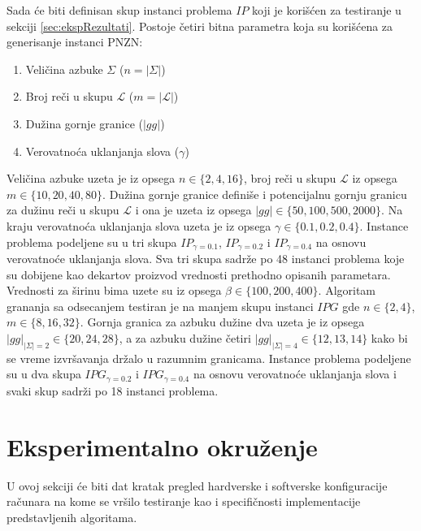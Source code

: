 \documentclass[12pt,oneside]{memoir}
\begin{document}
Sada će biti definisan skup instanci problema $IP$ koji je korišćen za testiranje u sekciji \ref{sec:ekspRezultati}.
Postoje četiri bitna parametra koja su korišćena za generisanje instanci PNZN:
\begin{enumerate}
  \item Veličina azbuke $\Sigma$ ($n=|\Sigma|$)
  \item Broj reči u skupu $\mathcal{L}$ ($m=|\mathcal{L}|$)
  \item Dužina gornje granice ($|gg|$)
  \item Verovatnoća uklanjanja slova ($\gamma$)
\end{enumerate}
Veličina azbuke uzeta je iz opsega $n \in \{2,4,16 \}$, broj reči u skupu $\mathcal{L}$
iz opsega $m \in \{10,20,40,80\}$. Dužina gornje granice definiše i potencijalnu gornju
granicu za dužinu reči u skupu $\mathcal{L}$ i ona je uzeta iz opsega $|gg| \in \{50,100,500,2000\}$.
Na kraju verovatnoća uklanjanja slova uzeta je iz opsega $\gamma \in \{0.1,0.2,0.4\}$.
Instance problema podeljene su u tri skupa $IP_{\gamma=0.1}$, $IP_{\gamma=0.2}$ i $IP_{\gamma=0.4}$
na osnovu verovatnoće uklanjanja slova. Sva tri skupa sadrže po 48 instanci problema
koje su dobijene kao dekartov proizvod vrednosti prethodno opisanih parametara.
Vrednosti za širinu bima uzete su iz opsega $\beta \in \{100,200,400\}$.
Algoritam grananja sa odsecanjem testiran je na manjem skupu instanci
$IPG$ gde $n \in \{2,4\}$, $m \in \{8,16,32\}$. Gornja granica za azbuku dužine dva
uzeta je iz opsega $|gg|_{|\Sigma|=2} \in \{20,24,28\}$, a za azbuku dužine četiri
$|gg|_{|\Sigma|=4} \in \{12,13,14\}$ kako bi se vreme izvršavanja držalo u razumnim
granicama. Instance problema podeljene su u dva skupa $IPG_{\gamma=0.2}$ i $IPG_{\gamma=0.4}$
na osnovu verovatnoće uklanjanja slova i svaki skup sadrži po 18 instanci problema.

\section{Eksperimentalno okruženje}
\label{sec:ekspOkruženje}
U ovoj sekciji će biti dat kratak pregled hardverske i softverske konfiguracije
računara na kome se vršilo testiranje kao i specifičnosti implementacije
predstavljenih algoritama.
\end{document}
